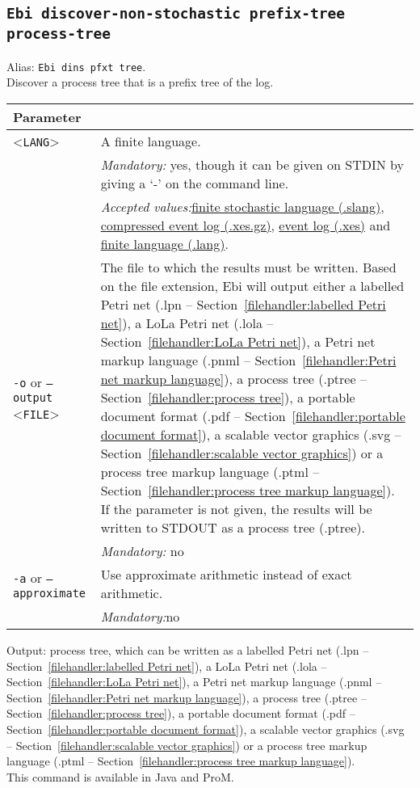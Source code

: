 {\subsection{\texttt{Ebi discover-non-stochastic prefix-tree process-tree}}
\label{command:Ebi discover-non-stochastic prefix-tree process-tree}
Alias: \texttt{Ebi dins pfxt tree}.\\
Discover a process tree that is a prefix tree of the log.\\
\begin{tabularx}{\linewidth}{lX}
\toprule
Parameter \\\midrule
<\texttt{LANG}>&A finite language.\\
&\textit{Mandatory:} \quad yes, though it can be given on STDIN by giving a `-' on the command line.\\
&\textit{Accepted values:}\quad \hyperref[filehandler:finite stochastic language]{finite stochastic language (.slang)}, \hyperref[filehandler:compressed event log]{compressed event log (.xes.gz)}, \hyperref[filehandler:event log]{event log (.xes)} and \hyperref[filehandler:finite language]{finite language (.lang)}.\\
\texttt{-o} or \texttt{--output} <\texttt{FILE}> &
The file to which the results must be written. Based on the file extension, Ebi will output either a labelled Petri net (.lpn -- Section~\ref{filehandler:labelled Petri net}), a LoLa Petri net (.lola -- Section~\ref{filehandler:LoLa Petri net}), a Petri net markup language (.pnml -- Section~\ref{filehandler:Petri net markup language}), a process tree (.ptree -- Section~\ref{filehandler:process tree}), a portable document format (.pdf -- Section~\ref{filehandler:portable document format}), a scalable vector graphics (.svg -- Section~\ref{filehandler:scalable vector graphics}) or a process tree markup language (.ptml -- Section~\ref{filehandler:process tree markup language}).
If the parameter is not given, the results will be written to STDOUT as a process tree (.ptree).\\
&\textit{Mandatory:} \quad no\\
\texttt{-a} or \texttt{--approximate} & Use approximate arithmetic instead of exact arithmetic.\\
&\textit{Mandatory:}\quad no\\
\bottomrule
\end{tabularx}
\noindent Output: process tree, which can be written as a labelled Petri net (.lpn -- Section~\ref{filehandler:labelled Petri net}), a LoLa Petri net (.lola -- Section~\ref{filehandler:LoLa Petri net}), a Petri net markup language (.pnml -- Section~\ref{filehandler:Petri net markup language}), a process tree (.ptree -- Section~\ref{filehandler:process tree}), a portable document format (.pdf -- Section~\ref{filehandler:portable document format}), a scalable vector graphics (.svg -- Section~\ref{filehandler:scalable vector graphics}) or a process tree markup language (.ptml -- Section~\ref{filehandler:process tree markup language}).
\\This command is available in Java and ProM.
}
